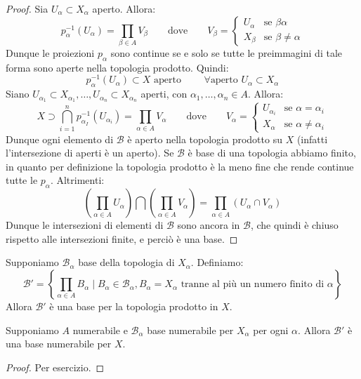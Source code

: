 \documentclass{article}
\begin{document}
\begin{proof}
	Sia $U_\alpha \subset X_\alpha$ aperto. Allora:
	$$p_\alpha ^{-1} (U_\alpha)=\prod_{\beta \in A} V_\beta \qquad
	\text{dove}\qquad V_\beta =\begin{cases}U_\alpha & \text{se }\beta \alpha \\
	X_\beta & \text{se } \beta \ne \alpha \end{cases}$$
	Dunque le proiezioni $p_\alpha$ sono continue se e solo se tutte le
	preimmagini di tale forma sono aperte nella topologia prodotto.
    Quindi:
	$$p_\alpha ^{-1} (U_\alpha) \subset X \text{ aperto } \qquad \forall \text{
	aperto } U_\alpha \subset X_\alpha$$
	Siano $U_{\alpha _1} \subset X_{\alpha _1} , \dots , U_{\alpha _n} \subset
	X_{\alpha _n}$ aperti, con $\alpha _1, \dots, \alpha _n \in A$. Allora:
	$$X \supset \bigcap _{i=1}^n p_{\alpha _I}^{-1}(U_{\alpha _i}) = \prod
	_{\alpha \in A} V_\alpha \qquad \text{dove}\qquad V_\alpha =
	\begin{cases}U_{\alpha _i} & \text{se }\alpha =\alpha  _i \\ X_\alpha &
	\text{se } \alpha \ne \alpha _i \end{cases}$$
	Dunque ogni elemento di $\mathcal{B}$ è aperto nella topologia prodotto su
	$X$ (infatti l'intersezione di aperti è un aperto). Se $ \mathcal{B}$ è
	base di una topologia abbiamo finito, in quanto per definizione la topologia
	prodotto è la meno fine che rende continue tutte le $p_\alpha$.
	Altrimenti:
	$$\left( \prod_{\alpha \in A} U_\alpha \right) \bigcap \left( \prod_{\alpha
	\in A} V_\alpha \right)=\prod _{\alpha \in A} (U_\alpha \cap V_\alpha)$$
	Dunque le intersezioni di elementi di $\mathcal{B}$ sono ancora in
	$\mathcal{B}$, che quindi è chiuso rispetto alle intersezioni finite, e
	perciò è una base.
\end{proof}
\begin{oss}
	Supponiamo $\mathcal{B}_\alpha$ base della topologia di $X_\alpha$.
	Definiamo:
	$$\mathcal{B}'=\left \{ \prod_{\alpha \in A} B_\alpha \mid B_\alpha \in
	\mathcal{B}_\alpha, B_\alpha =X_\alpha \text{ tranne al più un numero
	finito di } \alpha \right \}$$
	Allora $\mathcal{B}'$ è una base per la topologia prodotto in $X$.
\end{oss}
\begin{cor}
	Supponiamo $A$ numerabile e $\mathcal{B}_\alpha$ base numerabile per
	$X_\alpha$ per ogni $\alpha$. Allora $\mathcal{B}'$ è una base numerabile
	per $X$.
\end{cor}
\begin{proof}
	Per esercizio.
\end{proof}
\end{document}
